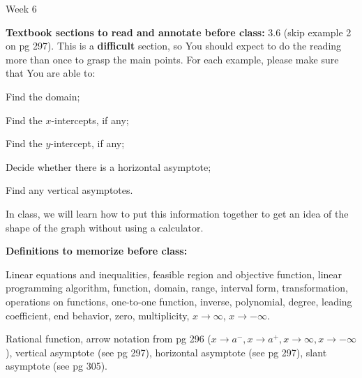 \documentclass[12pt,dvipsnames]{article}
\begin{document}
\thispagestyle{empty}

	\begin{center}
		{\large{Week 6}}
	\end{center}

{\bfseries{Textbook sections to read and annotate before class:}}  3.6 (skip example 2 on pg 297). This is a {\bf{difficult}} section, so You should expect to do the reading more than once to grasp the main points. For each example, please make sure that You are able to: \begin{enumerate*}[label=(\arabic*)]
  \item Find the domain;
  \item Find the $x$-intercepts, if any; \item Find the $y$-intercept, if any; \item Decide whether there is a horizontal asymptote;\item Find any vertical asymptotes.
\end{enumerate*}
In class, we will learn how to put this information together to get an idea of the shape of the graph without using a calculator.
\smallskip

	{\bfseries{Definitions to memorize before class:}} 

\begin{description}[topsep=0pt,itemsep=-2ex,partopsep=0ex,parsep=1ex]
\item[From Weeks 1-5] Linear equations and inequalities, feasible region and objective function, linear programming algorithm,  function, domain, range, interval form, transformation, operations on functions, one-to-one function, inverse, polynomial, degree, leading coefficient, end behavior, zero, multiplicity, $x\to \infty$, $x\to -\infty$. 
\item[From Section 3.6] Rational function, arrow notation from pg 296 ($x\to a^{-}, x\to a^{+}, x\to \infty, x\to -\infty$), vertical asymptote (see pg 297), horizontal asymptote (see pg 297), slant asymptote (see pg 305).
\end{description}
\smallskip	
	
\end{document}
